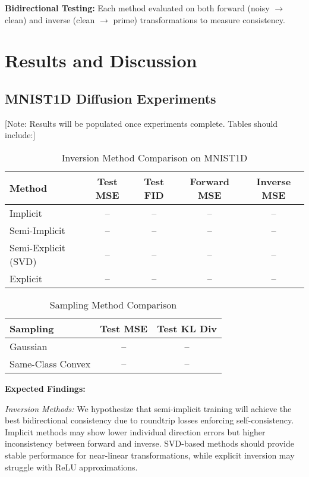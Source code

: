 \documentclass[sigconf]{acmart}
\begin{document}
\textbf{Bidirectional Testing:} Each method evaluated on both forward (noisy $\to$ clean) and inverse (clean $\to$ prime) transformations to measure consistency.

\section{Results and Discussion}

\subsection{MNIST1D Diffusion Experiments}

[Note: Results will be populated once experiments complete. Tables should include:]

\begin{table}[h]
\caption{Inversion Method Comparison on MNIST1D}
\label{tab:inversion-comparison}
\begin{tabular}{l|cccc}
\toprule
Method & Test MSE & Test FID & Forward MSE & Inverse MSE \\
\midrule
Implicit & -- & -- & -- & -- \\
Semi-Implicit & -- & -- & -- & -- \\
Semi-Explicit (SVD) & -- & -- & -- & -- \\
Explicit & -- & -- & -- & -- \\
\bottomrule
\end{tabular}
\end{table}

\begin{table}[h]
\caption{Sampling Method Comparison}
\label{tab:sampling-comparison}
\begin{tabular}{l|cc}
\toprule
Sampling & Test MSE & Test KL Div \\
\midrule
Gaussian & -- & -- \\
Same-Class Convex & -- & -- \\
\bottomrule
\end{tabular}
\end{table}

\textbf{Expected Findings:}

\textit{Inversion Methods:} We hypothesize that semi-implicit training will achieve the best bidirectional consistency due to roundtrip losses enforcing self-consistency. Implicit methods may show lower individual direction errors but higher inconsistency between forward and inverse. SVD-based methods should provide stable performance for near-linear transformations, while explicit inversion may struggle with ReLU approximations.
\end{document}
